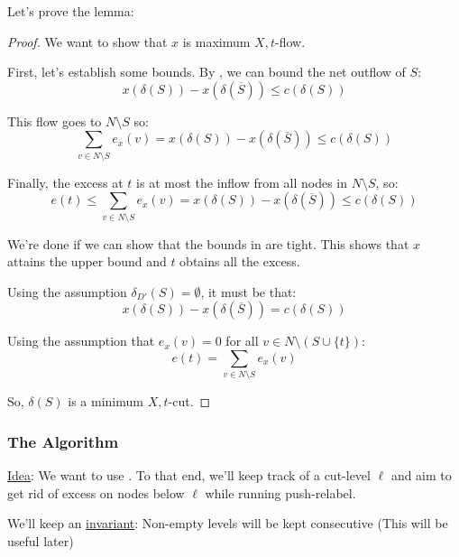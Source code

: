 Let's prove the lemma:
\begin{proof}
    We want to show that $x$ is maximum $X,t$-flow.

    First, let's establish some bounds. By , we can bound the net outflow of $S$:
    \begin{equation*}
        x(\delta(S)) - x(\delta(\overline{S})) \leq c(\delta(S))
    \end{equation*}

    This flow goes to $N\setminus S$ so:
    \begin{equation*}
        \sum_{v \in N \setminus S} e_x(v) = x(\delta(S)) - x(\delta(\overline{S})) \leq c(\delta(S))
    \end{equation*}
    
    Finally, the excess at $t$ is at most the inflow from all nodes in $N \setminus S$, so:
    \begin{equation}\label{eq:xt-flow-bound}
        e(t) \leq \sum_{v \in N \setminus S} e_x(v) = x(\delta(S)) - x(\delta(\overline{S})) \leq c(\delta(S))
    \end{equation}

    We're done if we can show that the bounds in  are tight.
    This shows that $x$ attains the upper bound and $t$ obtains all the excess.

    Using the assumption $\delta_{D'}(S) = \emptyset$, it must be that:
    \begin{equation*}
        x(\delta(S)) - x(\delta(\overline{S})) = c(\delta(S))
    \end{equation*}

    Using the assumption that $e_x(v) = 0$ for all $v \in N\setminus(S \cup \{t\})$:
    \begin{equation*}
        e(t) = \sum_{v \in N \setminus S} e_x(v)
    \end{equation*}

    So, $\delta(S)$ is a minimum $X,t$-cut.
\end{proof}

\subsubsection{The Algorithm}
\underline{Idea}: We want to use . To that end, we'll keep track of a cut-level $\ell$ and aim to get rid of excess on nodes below $\ell$ while running push-relabel.

\begin{note}
    We'll keep an \underline{invariant}: Non-empty levels will be kept consecutive (This will be useful later)
\end{note}

